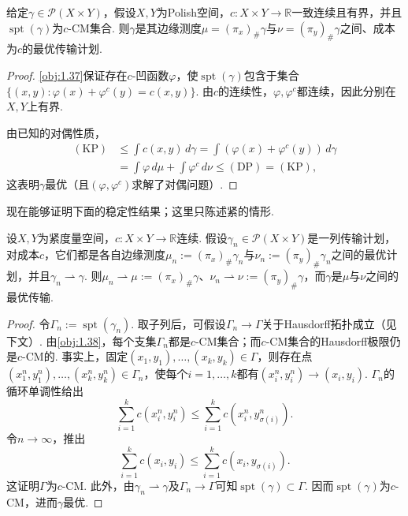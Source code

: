 \begin{theorem}\label{obj:1.49}
给定$\gamma\in\mathscr P(X\times Y)$，假设$X,Y$为Polish空间，$c:X\times Y\to\mathbb R$一致连续且有界，并且$\operatorname{spt}(\gamma)$为$c$-CM集合. 则$\gamma$是其边缘测度$\mu=(\pi_x)_\#\gamma$与$\nu=(\pi_y)_\#\gamma$之间、成本为$c$的最优传输计划.
\end{theorem}
\begin{proof}
\autoref{obj:1.37}保证存在$c$-凹函数$\varphi$，使$\operatorname{spt}(\gamma)$包含于集合$\{(x,y):\varphi(x)+\varphi^c(y)=c(x,y)\}$. 由$c$的连续性，$\varphi,\varphi^c$都连续，因此分别在$X,Y$上有界.

由已知的对偶性质，
\begin{equation*}
\begin{aligned}
(\mathrm{KP})&\le\int c(x,y)\,d\gamma
=\int(\varphi(x)+\varphi^c(y))\,d\gamma\\
&=\int\varphi\,d\mu+\int\varphi^c\,d\nu
\le(\mathrm{DP})=(\mathrm{KP}),
\end{aligned}
\end{equation*}
这表明$\gamma$最优（且$(\varphi,\varphi^c)$求解了对偶问题）.
\end{proof}

现在能够证明下面的稳定性结果；这里只陈述紧的情形.

\begin{theorem}\label{obj:1.50}
设$X,Y$为紧度量空间，$c:X\times Y\to\mathbb R$连续. 假设$\gamma_n\in\mathscr P(X\times Y)$是一列传输计划，对成本$c$，它们都是各自边缘测度$\mu_n:=(\pi_x)_\#\gamma_n$与$\nu_n:=(\pi_y)_\#\gamma_n$之间的最优计划，并且$\gamma_n\rightharpoonup\gamma$. 则$\mu_n\rightharpoonup\mu:=(\pi_x)_\#\gamma$、$\nu_n\rightharpoonup\nu:=(\pi_y)_\#\gamma$，而$\gamma$是$\mu$与$\nu$之间的最优传输.
\end{theorem}
\begin{proof}
令$\Gamma_n:=\operatorname{spt}(\gamma_n)$. 取子列后，可假设$\Gamma_n\to\Gamma$关于Hausdorff拓扑成立（见下文）. 由\autoref{obj:1.38}，每个支集$\Gamma_n$都是$c$-CM集合；而$c$-CM集合的Hausdorff极限仍是$c$-CM的. 事实上，固定$(x_1,y_1),\ldots,(x_k,y_k)\in\Gamma$，则存在点$(x_1^n,y_1^n),\ldots,(x_k^n,y_k^n)\in\Gamma_n$，使每个$i=1,\ldots,k$都有$(x_i^n,y_i^n)\to(x_i,y_i)$. $\Gamma_n$的循环单调性给出
\[
\sum_{i=1}^k c(x_i^n,y_i^n)\le\sum_{i=1}^k c(x_i^n,y_{\sigma(i)}^n).
\]
令$n\to\infty$，推出
\[
\sum_{i=1}^k c(x_i,y_i)\le\sum_{i=1}^k c(x_i,y_{\sigma(i)}).
\]
这证明$\Gamma$为$c$-CM. 此外，由$\gamma_n\rightharpoonup\gamma$及$\Gamma_n\to\Gamma$可知$\operatorname{spt}(\gamma)\subset\Gamma$. 因而$\operatorname{spt}(\gamma)$为$c$-CM，进而$\gamma$最优.
\end{proof}

